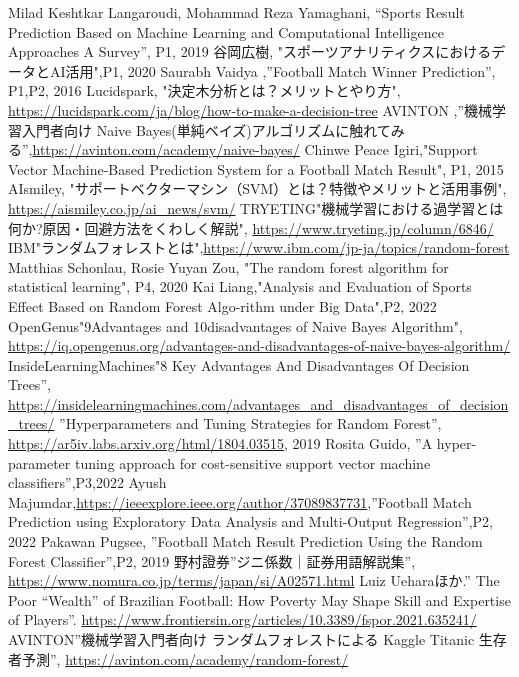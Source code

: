 \documentclass[platex]{suribt}
\begin{document}
\begin{thebibliography}{2}%
\bibitem{}
Milad Keshtkar Langaroudi, Mohammad Reza Yamaghani, “Sports Result Prediction Based on Machine Learning and Computational Intelligence Approaches A Survey”, P1, 2019
\bibitem{}
谷岡広樹, "スポーツアナリティクスにおけるデータとAI活用",P1, 2020
\bibitem{}
Saurabh Vaidya ,”Football Match Winner Prediction”, P1,P2, 2016
\bibitem{}
Lucidspark, "決定木分析とは？メリットとやり方", \url{https://lucidspark.com/ja/blog/how-to-make-a-decision-tree}
\bibitem{}
AVINTON ,”機械学習入門者向け Naive Bayes(単純ベイズ)アルゴリズムに触れてみる”,\url{https://avinton.com/academy/naive-bayes/}
\bibitem{}
Chinwe Peace Igiri,"Support Vector Machine-Based Prediction System for a Football Match Result", P1, 2015
\bibitem{}
AIsmiley, "サポートベクターマシン（SVM）とは？特徴やメリットと活用事例", \url{https://aismiley.co.jp/ai_news/svm/}
\bibitem{}
TRYETING"機械学習における過学習とは何か?原因・回避方法をくわしく解説", \url{https://www.tryeting.jp/column/6846/}
\bibitem{}
IBM"ランダムフォレストとは",\url{https://www.ibm.com/jp-ja/topics/random-forest}
\bibitem{}
Matthias Schonlau, Rosie Yuyan Zou, "The random forest algorithm for statistical learning", P4, 2020
\bibitem{}
Kai Liang,"Analysis and Evaluation of Sports Effect Based on Random Forest Algo-rithm under Big Data",P2, 2022
\bibitem{}
OpenGenus"9Advantages and 10disadvantages of Naive Bayes Algorithm", \url{https://iq.opengenus.org/advantages-and-disadvantages-of-naive-bayes-algorithm/}
\bibitem{}
InsideLearningMachines"8 Key Advantages And Disadvantages Of Decision Trees”, \url{https://insidelearningmachines.com/advantages_and_disadvantages_of_decision_trees/}
\bibitem{}
”Hyperparameters and Tuning Strategies for Random Forest”, \url{https://ar5iv.labs.arxiv.org/html/1804.03515}, 2019
\bibitem{}
Rosita Guido, ”A hyper-parameter tuning approach for cost-sensitive support vector machine classifiers”,P3,2022
\bibitem{}
Ayush Majumdar,\url{https://ieeexplore.ieee.org/author/37089837731},”Football Match Prediction using Exploratory Data Analysis and Multi-Output Regression”,P2, 2022
\bibitem{}
Pakawan Pugsee, ”Football Match Result Prediction Using the Random Forest Classifier”,P2, 2019
\bibitem{}
野村證券”ジニ係数｜証券用語解説集”, \url{https://www.nomura.co.jp/terms/japan/si/A02571.html}
\bibitem{}
Luiz Ueharaほか.” The Poor “Wealth” of Brazilian Football: How Poverty May Shape Skill and Expertise of Players”. \url{https://www.frontiersin.org/articles/10.3389/fspor.2021.635241/}
\bibitem{}
AVINTON”機械学習入門者向け ランダムフォレストによる Kaggle Titanic 生存者予測”, \url{https://avinton.com/academy/random-forest/}

\end{thebibliography}
\end{document}

